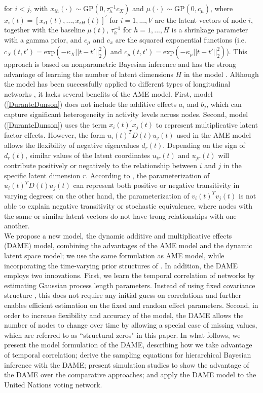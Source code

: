 \documentclass[a4paper]{article}
\begin{document}
		for $i<j$, with $x_{ih}(\cdot) \sim \mbox{GP}(0, \tau_h^{-1}c_X)$ and $\mu(\cdot) \sim \mbox{GP}(0, c_\mu)$,
		where $x_i(t)=[x_{i1}(t),...,x_{iH}(t)]^\prime$ for $i = 1,...,V$ are the latent vectors of node $i$, together with the baseline $\mu(t)$, $\tau_h^{-1}$ for $h=1,...,H$ is a shrinkage parameter with a gamma prior, and $c_\mu$ and $c_x$ are the squared exponential functions (i.e. $c_X(t, t') = \mbox{exp}(-\kappa_X||t-t'||_2^2)$ and $c_\mu(t, t') = \mbox{exp}(-\kappa_\mu||t-t'||_2^2)$). This approach is based on nonparametric Bayesian inference and has the strong advantage of learning the number of latent dimensions $H$ in the model \citep{bhattacharya2011sparse}. Although the model has been successfully applied to different types of longitudinal networks \citep{durante2014bayesian2,durante2014bayesian}, it lacks several benefits of the AME model. First, model (\ref{DuranteDunson}) does not include the additive effects $a_i$ and $b_j$, which can capture significant heterogeneity in activity levels across nodes. Second, model (\ref{DuranteDunson}) uses the term $x_i(t)^\prime x_j(t)$ to represent multiplicative latent factor effects. However, the form $u_i(t)^TD(t)u_j(t)$ used in the AME model allows the flexibility of negative eigenvalues $d_r(t)$. Depending on the sign of $d_r(t)$, similar values of the latent coordinates $u_{ir}(t)$ and $u_{jr}(t)$ will contribute positively or negatively to the relationship between $i$ and $j$ in the specific latent dimension $r$. According to \cite{hoff2008modeling}, the parameterization of $u_i(t)^TD(t)u_j(t)$ can represent both positive or negative transitivity in varying degrees; on the other hand, the parameterization of $v_i(t)^Tv_j(t)$ is not able to explain negative transitivity or stochastic equivalence, where nodes with the same or similar latent vectors do not have trong relationships with one another.\\ \newline
		We propose a new model, the dynamic additive and multiplicative effects (DAME) model, combining the advantages of the AME model and the dynamic latent space model; we use the same formulation as AME model, while incorporating the time-varying prior structures of \cite{durante2013nonparametric}. In addition, the DAME employs two innovations. First, we learn the temporal correlation of networks by estimating Gaussian process length parameters. Instead of using fixed covariance structure \citep{durante2013nonparametric,durante2014bayesian}, this does not require any initial guess on correlations and further enables efficient estimation on the fixed and random effect parameters. Second, in order to increase flexibility and accuracy of the model, the DAME allows the number of nodes to change over time by allowing a special case of missing values, which are referred to as ``structural zeros" in this paper. In what follows, we present the model formulation of the DAME, describing how we take advantage of temporal correlation; derive the sampling equations for hierarchical Bayesian inference with the DAME; present simulation studies to show the advantage of the DAME over the comparative approaches; and apply the DAME model to the United Nations voting network.
\end{document}
